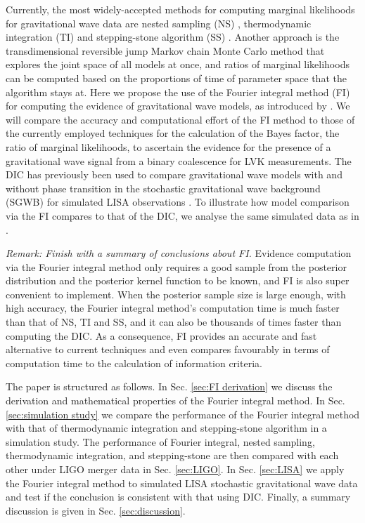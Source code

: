 \documentclass[%
 reprint,
 amsmath,amssymb,
 aps,
]{revtex4-2}
\begin{document}
Currently, the most widely-accepted methods for computing marginal likelihoods for gravitational wave data are nested sampling (NS) \cite{skilling2006nested, veitch2010bayesian}, thermodynamic integration (TI) \cite{gelman1998simulating, lartillot2006computing} and stepping-stone algorithm (SS) \cite{xie2011improving, maturana2019stepping}. Another approach is the transdimensional reversible jump Markov chain Monte Carlo method \cite{green1995reversible, umstatter2005bayesian} that explores the joint space of all models at once, and ratios of marginal likelihoods can be computed based on the proportions of time of parameter space that the algorithm stays at. Here we propose the use of the Fourier integral method (FI) for computing the evidence of  gravitational wave models, as introduced by \cite{rotiroti2022computing}. We will compare the accuracy and computational effort of the FI method to those of the currently employed techniques for the calculation of the Bayes factor, the ratio of marginal likelihoods, to ascertain the evidence for the presence of a gravitational wave signal from a binary coalescence for LVK measurements. The DIC has previously been used to compare gravitational wave models with and without phase transition in the stochastic gravitational wave background (SGWB) for simulated LISA observations \cite{BoileauGuillaume2023PfLt}. To illustrate how model comparison via the FI compares to that of the DIC, we analyse the same simulated data as in \cite{BoileauGuillaume2023PfLt}.

{\em Remark: Finish with a summary of conclusions about FI.}
Evidence computation via the Fourier integral method only requires a good sample from the posterior distribution and the posterior kernel function to be known, and FI is also super convenient to implement. When the posterior sample size is large enough, with high accuracy, the Fourier integral method's computation time is much faster than that of NS, TI and SS, and it can also be thousands of times faster than computing the DIC. As a consequence,
FI provides an accurate and fast alternative to current techniques and even compares favourably in terms of computation time to the calculation of information criteria.

The paper is structured as follows. In Sec. \ref{sec:FI derivation} we discuss the derivation and mathematical properties of the Fourier integral method. In Sec. \ref{sec:simulation study} we compare the performance of the Fourier integral method with that of thermodynamic integration and stepping-stone algorithm in a simulation study. The performance of Fourier integral, nested sampling, thermodynamic integration, and stepping-stone are then compared with each other under LIGO merger data in Sec. \ref{sec:LIGO}. In Sec. \ref{sec:LISA} we apply the Fourier integral method to simulated LISA stochastic gravitational wave data and test if the conclusion is consistent with that using DIC. Finally, a summary discussion is given in Sec. \ref{sec:discussion}.
\end{document}
